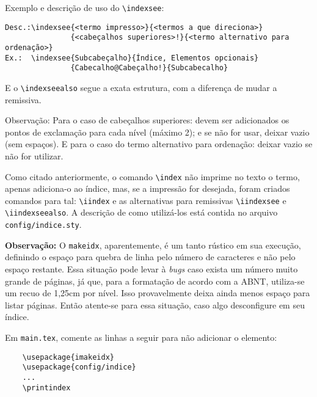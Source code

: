     Exemplo e descrição de uso do \verb|\indexsee|:
\begin{verbatim}
Desc.:\indexsee{<termo impresso>}{<termos a que direciona>}
               {<cabeçalhos superiores>!}{<termo alternativo para ordenação>}
Ex.:  \indexsee{Subcabeçalho}{Índice, Elementos opcionais}
               {Cabecalho@Cabeçalho!}{Subcabecalho}
\end{verbatim}%
E o \verb|\indexseealso| segue a exata estrutura, com a diferença de mudar a remissiva. 

    Observação: Para o caso de cabeçalhos superiores: devem ser adicionados os pontos de exclamação para cada nível (máximo 2); e se não for usar, deixar vazio (sem espaços). E para o caso do termo alternativo para ordenação: deixar vazio se não for utilizar.

    Como citado anteriormente, o comando \verb|\index| não imprime no texto o termo, apenas adiciona-o ao índice, mas, se a impressão for desejada, foram criados comandos para tal: \verb|\iindex| e as alternativas para remissivas \verb|\iindexsee| e \verb|\iindexseealso|. A descrição de como utilizá-los está contida no arquivo \texttt{config/indice.sty}.

    \textbf{Observação:} O \texttt{makeidx}, aparentemente, é um tanto rústico em sua execução, definindo o espaço para quebra de linha pelo número de caracteres e não pelo espaço restante. Essa situação pode levar à \textit{bugs} caso exista um número muito grande de páginas, já que, para a formatação de acordo com a ABNT, utiliza-se um recuo de 1,25cm por nível. Isso provavelmente deixa ainda menos espaço para listar páginas. Então atente-se para essa situação, caso algo desconfigure em seu índice.

    Em \texttt{main.tex}, comente as linhas a seguir para não adicionar o elemento: 
\begin{verbatim}
    \usepackage{imakeidx}
    \usepackage{config/indice}
    ...
    \printindex
\end{verbatim}
    